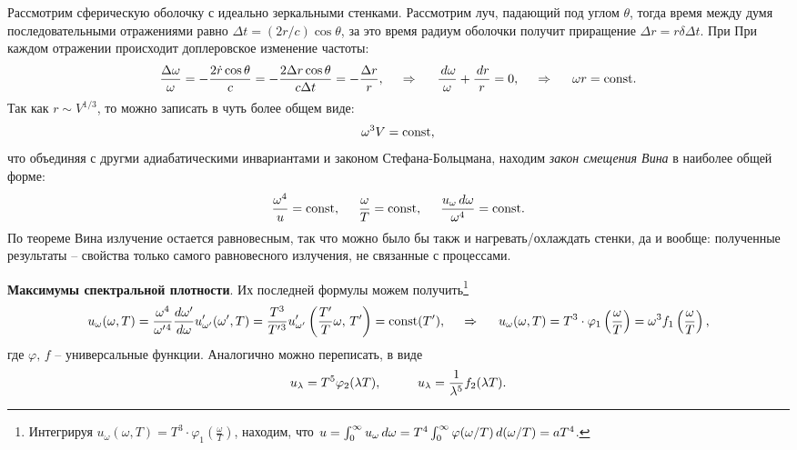 Рассмотрим сферическую оболочку с идеально зеркальными стенками. Рассмотрим луч, падающий под углом $\theta$, тогда время между думя последовательными отражениями равно $\Delta t = (2r/c) \cos \theta$, за это время радиум оболочки получит приращение $\Delta r = r\delta \Delta t$. При При каждом отражении происходит доплеровское изменение частоты:
\begin{equation*}
    \frac{\Delta \omega}{\omega} = - \frac{2 \dot{r} \cos \theta}{c} = - \frac{2 \Delta r \cos \theta}{c \Delta t} = - \frac{\Delta r}{r},
    \hspace{0.5cm} \Rightarrow \hspace{0.5cm}
    \frac{\, d \omega}{\omega} + \frac{\, d r}{r} = 0,
    \hspace{0.5cm} \Rightarrow \hspace{0.5cm}
    \omega r = \textnormal{const}.
\end{equation*}
Так как $r \sim V^{1/3}$, то можно записать в чуть более общем виде:
\begin{equation*}
    \omega^3 V = \textnormal{const},
\end{equation*}
что объединяя с другми адиабатическими инвариантами и законом Стефана-Больцмана, находим \textit{закон смещения Вина} в наиболее общей форме:
\begin{equation}
    \frac{\omega^4}{u} = \textnormal{const},
    \hspace{5 mm} 
    \frac{\omega}{T} = \textnormal{const},
    \hspace{5 mm} 
    \frac{u_\omega \, d \omega}{\omega^4} = \textnormal{const}.
\end{equation}
По теореме Вина излучение остается равновесным, так что можно было бы такж и нагревать/охлаждать стенки, да и вообще: полученные результаты -- свойства только самого равновесного излучения, не связанные с процессами.


\textbf{Максимумы спектральной плотности}. 
Их последней формулы можем получить\footnote{
    Интегрируя $u_\omega (\omega, T) = T^3 \cdot \varphi_1\left(\frac{\omega}{T}\right)$, находим, что
    $u = \int_{0}^{\infty} u_\omega \, d \omega = T^4 \int_{0}^{\infty} \varphi(\omega/T) \, d (\omega/T) = a T^4$.
}   
\begin{equation*}
    u_\omega (\omega, T) = \frac{\omega^4}{\omega'{}^4} \frac{d \omega'}{d \omega} u'_{\omega'} (\omega', T) = \frac{T^3}{T'{}^3} u'_{\omega'} \left(\frac{T'}{T} \omega,\, T'\right) = \textnormal{const}(T'),
    \hspace{0.5cm} \Rightarrow \hspace{0.5cm}  
    u_\omega (\omega, T) = T^3 \cdot \varphi_1\left(\frac{\omega}{T}\right) = \omega^3 f_1\left(\frac{\omega}{T}\right)
    ,
\end{equation*}
где $\varphi,\,  f$ -- универсальные функции. Аналогично можно переписать, в виде
\begin{equation*}
    u_\lambda = T^5 \varphi_2 (\lambda T),
    \hspace{10 mm}  
    u_\lambda = \frac{1}{\lambda^5} f_2(\lambda T).
\end{equation*}



